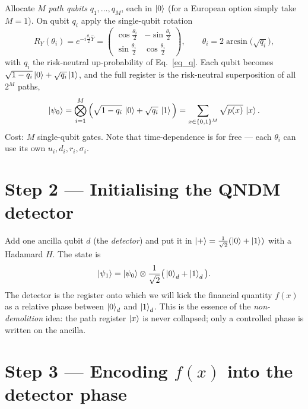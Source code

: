 \documentclass{article}
\begin{document}
Allocate $M$ \emph{path qubits} $q_1,\dots,q_M$, each in $\ket{0}$ (for a European option simply take $M=1$). On qubit $q_i$ apply the single-qubit rotation
\begin{equation}
R_Y(\theta_i) = e^{-i\frac{\theta_i}{2}\hat Y}=
\begin{pmatrix}
\cos\frac{\theta_i}{2} & -\sin\frac{\theta_i}{2}\\[4pt]
\sin\frac{\theta_i}{2} & \cos\frac{\theta_i}{2}
\end{pmatrix},
\qquad
\theta_i = 2\arcsin\!\big(\sqrt{q_i}\big),
\end{equation}
with $q_i$ the risk-neutral up-probability of Eq.~\eqref{eq_q}. Each qubit becomes $\sqrt{1-q_i}\ket{0}+\sqrt{q_i}\ket{1}$, and the full register is the risk-neutral superposition of all $2^M$ paths,
\begin{equation}\label{eq_psi0}
\ket{\psi_0} = \bigotimes_{i=1}^{M}\Big(\sqrt{1-q_i}\,\ket{0} + \sqrt{q_i}\,\ket{1}\Big)
= \sum_{x\in\{0,1\}^M}\sqrt{p(x)}\,\ket{x}.
\end{equation}
Cost: $M$ single-qubit gates. Note that time-dependence is for free --- each $\theta_i$ can use its own $u_i,d_i,r_i,\sigma_i$.


\section{Step 2 --- Initialising the QNDM detector}

Add one ancilla qubit $d$ (the \emph{detector}) and put it in $\ket{+}=\tfrac{1}{\sqrt2}(\ket{0}+\ket{1})$ with a Hadamard $H$. The state is
\begin{equation}
\ket{\psi_1} = \ket{\psi_0}\otimes \frac{1}{\sqrt2}\big(\ket{0}_d + \ket{1}_d\big).
\end{equation}
The detector is the register onto which we will kick the financial quantity $f(x)$ as a relative phase between $\ket{0}_d$ and $\ket{1}_d$. This is the essence of the \emph{non-demolition} idea: the path register $\ket{x}$ is never collapsed; only a controlled phase is written on the ancilla.


\section{Step 3 --- Encoding $f(x)$ into the detector phase}\label{sec_step3}
\end{document}

